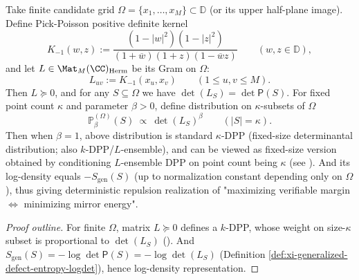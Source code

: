 \begin{proposition}\label{prop:xi-pick-poisson-kdpp}
Take finite candidate grid \(\Omega=\{x_1,\dots,x_M\}\subset\mathbb{D}\) (or its upper half-plane image).
Define Pick-Poisson positive definite kernel
\[
K_{-1}(w,z):=\frac{(1-|w|^2)(1-|z|^2)}{(1+\overline w)(1+z)(1-\overline w z)}\qquad(w,z\in\mathbb{D}),
\]
and let \(L\in\Mat_M(\CC)_{\mathrm{Herm}}\) be its Gram on \(\Omega\):
\[
L_{uv}:=K_{-1}(x_u,x_v)\qquad(1\le u,v\le M).
\]
Then \(L\succeq 0\), and for any \(S\subseteq\Omega\) we have \(\det(L_S)=\det\mathsf P(S)\).
For fixed point count \(\kappa\) and parameter \(\beta>0\), define distribution on \(\kappa\)-subsets of \(\Omega\)
\[
\mathbb{P}_{\beta}^{(\Omega)}(S)\ \propto\ \det(L_S)^{\beta}\qquad(|S|=\kappa).
\]
Then when \(\beta=1\), above distribution is standard \(\kappa\)-DPP (fixed-size determinantal distribution; also \(k\)-DPP/\(L\)-ensemble), and can be viewed as fixed-size version obtained by conditioning \(L\)-ensemble DPP on point count being \(\kappa\) (see \cite{KuleszaTaskar2012DPP}).
And its log-density equals \(-S_{\mathrm{gen}}(S)\) (up to normalization constant depending only on \(\Omega\)), thus giving deterministic repulsion realization of "maximizing verifiable margin \(\Longleftrightarrow\) minimizing mirror energy".
\end{proposition}
\begin{proof}[Proof outline]
For finite \(\Omega\), matrix \(L\succeq 0\) defines a \(k\)-DPP, whose weight on size-\(\kappa\) subset is proportional to \(\det(L_S)\) (\cite{KuleszaTaskar2012DPP}).
And \(S_{\mathrm{gen}}(S)=-\log\det\mathsf P(S)=-\log\det(L_S)\) (Definition \ref{def:xi-generalized-defect-entropy-logdet}), hence log-density representation.
\end{proof}

